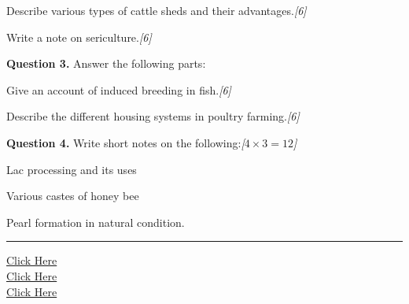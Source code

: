 \documentclass[11pt,a4paper]{article}
\newcommand{\pts}[1]{\hfill   \textit{[#1]}}
\begin{document}
\begin{parts}
  \item Describe various types of cattle sheds and their advantages.\pts{6}
  \item Write a note on sericulture.\pts{6}
\end{parts}

\medskip


\noindent   \textbf{Question 3.} Answer the following parts:

\begin{parts}
  \item Give an account of induced breeding in fish.\pts{6}
  \item Describe the different housing systems in poultry farming.\pts{6}
\end{parts}

\medskip


\noindent   \textbf{Question 4.} Write short notes on the following:\pts{$4  \times 3 = 12$}

\begin{parts}
  \item Lac processing and its uses
  \item Various castes of honey bee
  \item Pearl formation in natural condition.
\end{parts}

\vfill
\rule{\linewidth}{0.4pt}

\begin{center}\small
\href{https://bhu-exam.vercel.app/}{Click Here}\\[4pt]\href{https://me-aryan.vercel.app/}{Click Here}\\[4pt]\href{https://quashan-me.vercel.app/}{Click Here}
\end{center}
\end{document}
